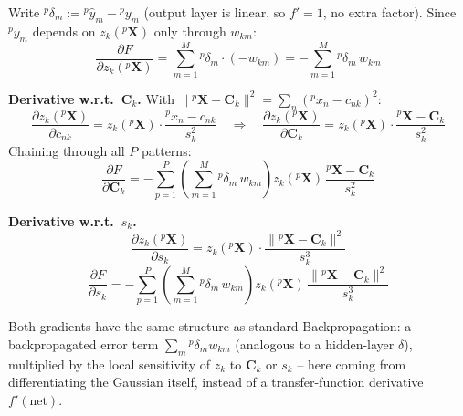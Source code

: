 \documentclass[11pt,a4paper]{article}
\begin{document}
Write ${}^p\delta_m:={}^p\hat y_m-{}^py_m$ (output layer is linear, so $f'=1$, no extra factor).
Since ${}^py_m$ depends on $z_k({}^p\mathbf X)$ only through $w_{km}$:
\[
  \frac{\partial F}{\partial z_k({}^p\mathbf X)} = \sum_{m=1}^M {}^p\delta_m\cdot(-w_{km}) = -\sum_{m=1}^M {}^p\delta_m\,w_{km}
\]

\textbf{Derivative w.r.t.\ $\mathbf C_k$.} With $\|{}^p\mathbf X-\mathbf C_k\|^2=\sum_n({}^px_n-c_{nk})^2$:
\[
  \frac{\partial z_k({}^p\mathbf X)}{\partial c_{nk}} = z_k({}^p\mathbf X)\cdot\frac{{}^px_n-c_{nk}}{s_k^2}
  \quad\Longrightarrow\quad
  \frac{\partial z_k({}^p\mathbf X)}{\partial \mathbf C_k} = z_k({}^p\mathbf X)\cdot\frac{{}^p\mathbf X-\mathbf C_k}{s_k^2}
\]
Chaining through all $P$ patterns:
\[
  \boxed{\frac{\partial F}{\partial \mathbf C_k} = -\sum_{p=1}^{P}\left(\sum_{m=1}^M {}^p\delta_m\,w_{km}\right) z_k({}^p\mathbf X)\,\frac{{}^p\mathbf X-\mathbf C_k}{s_k^2}}
\]

\textbf{Derivative w.r.t.\ $s_k$.}
\[
  \frac{\partial z_k({}^p\mathbf X)}{\partial s_k} = z_k({}^p\mathbf X)\cdot\frac{\|{}^p\mathbf X-\mathbf C_k\|^2}{s_k^3}
\]
\[
  \boxed{\frac{\partial F}{\partial s_k} = -\sum_{p=1}^{P}\left(\sum_{m=1}^M {}^p\delta_m\,w_{km}\right) z_k({}^p\mathbf X)\,\frac{\|{}^p\mathbf X-\mathbf C_k\|^2}{s_k^3}}
\]

Both gradients have the same structure as standard Backpropagation: a backpropagated error term
$\sum_m {}^p\delta_m w_{km}$ (analogous to a hidden-layer $\delta$), multiplied by the local
sensitivity of $z_k$ to $\mathbf C_k$ or $s_k$ -- here coming from differentiating the Gaussian
itself, instead of a transfer-function derivative $f'(\mathrm{net})$.
\end{document}
